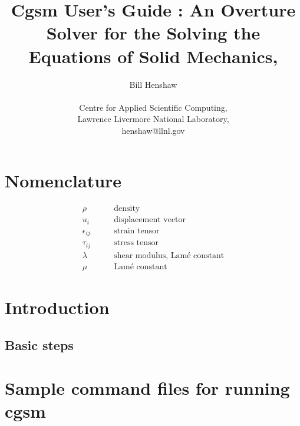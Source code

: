 \documentclass{article}
\begin{document}
 
\title{Cgsm User's Guide : An Overture Solver for the Solving the Equations of Solid Mechanics,}

\author{
Bill Henshaw \\
\  \\
Centre for Applied Scientific Computing, \\
Lawrence Livermore National Laboratory, \\
henshaw@llnl.gov }
 
\maketitle

\tableofcontents

\section{Nomenclature}
\begin{align}
  \rho & \qquad \mbox{density} \\
  u_i & \qquad \mbox{displacement vector} \\
  \epsilon_{ij} & \qquad \mbox{strain tensor} \\
  \tau_{ij} & \qquad \mbox{stress tensor} \\
  \lambda & \qquad \mbox{shear modulus, Lam\'e constant} \\
  \mu & \qquad \mbox{Lam\'e constant}
\end{align}

\section{Introduction}  \label{sec:intro}

\subsection{Basic steps}

\section{Sample command files for running cgsm} \label{sec:sampleCommand}


\end{document}
